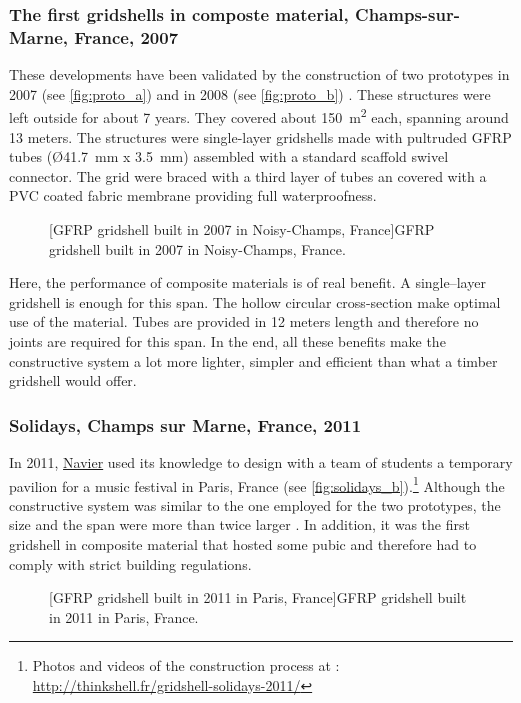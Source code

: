 \subsubsection{The first gridshells in composte material, Champs-sur-Marne, France, 2007}
\label{sec:proto}
These developments have been validated by the construction of two prototypes in 2007 (see \cref{fig:proto_a}) and in 2008 (see \ref{fig:proto_b}) \cite{Douthe2006}. These structures were left outside for about 7 years. They covered about \SI{150}{m^2} each, spanning around 13 meters. The structures were single-layer gridshells made with pultruded GFRP tubes (\O \SI{41.7}{mm} x \SI{3.5}{mm}) assembled with a standard scaffold swivel connector. The grid were braced with a third layer of tubes an covered with a PVC coated fabric membrane providing full waterproofness.
\begin{figure}[h]
		\hspace*{\fill}
		\vspace{10pt}
		[GFRP gridshell built in 2007 in Noisy-Champs, France]{GFRP gridshell built in 2007 in Noisy-Champs, France.}
		\label{fig:proto}    
\end{figure}

Here, the performance of composite materials is of real benefit. A single--layer gridshell is enough for this span. The hollow circular cross-section make optimal use of the material. Tubes are provided in 12 meters length and therefore no joints are required for this span. In the end, all these benefits make the constructive system a lot more lighter, simpler and efficient than what a timber gridshell would offer.

\subsubsection{Solidays, Champs sur Marne, France, 2011}
In 2011, \href{http://navier.enpc.fr}{Navier} used its knowledge to design with a team of students a temporary pavilion for a music festival in Paris, France (see \cref{fig:solidays_b}).\footnote{Photos and videos of the construction process at : \url{ http://thinkshell.fr/gridshell-solidays-2011/}} Although the constructive system was similar to the one employed for the two prototypes, the size and the span were more than twice larger  \cite{Baverel2012}. In addition, it was the first gridshell in composite material that hosted some pubic and therefore had to comply with strict building regulations. 
\begin{figure}[h]
		\hspace*{\fill}
		\vspace{10pt}
		[GFRP gridshell built in 2011 in Paris, France]{GFRP gridshell built in 2011 in Paris, France.}
		\label{fig:solidays}    
\end{figure}

